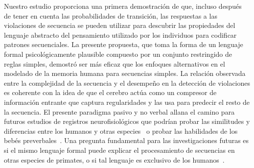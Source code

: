 
Nuestro estudio proporciona una primera demostración de que, incluso después de tener en cuenta las probabilidades de transición, las respuestas a las violaciones de secuencia se pueden utilizar para descubrir las propiedades del lenguaje abstracto del pensamiento utilizado por los individuos para codificar patrones secuenciales. La presente propuesta, que toma la forma de un lenguaje formal psicológicamente plausible compuesto por un conjunto restringido de reglas simples, demostró ser más eficaz que los enfoques alternativos en el modelado de la memoria humana para secuencias simples. La relación observada entre la complejidad de la secuencia y el desempeño en la detección de violaciones es coherente con la idea de que el cerebro actúa como un compresor de información entrante que captura regularidades y las usa para predecir el resto de la secuencia. El presente paradigma pasivo y no verbal allana el camino para futuros estudios de registros neurofisiológicos que podrían probar las similitudes y diferencias entre los humanos y otras especies~\cite{f13} o probar las habilidades de los bebés preverbales~\cite{f70}. Una pregunta fundamental para las investigaciones futuras es si el mismo lenguaje formal puede explicar el procesamiento de secuencias en otras especies de primates, o si tal lenguaje es exclusivo de los humanos~\cite{f6}.
